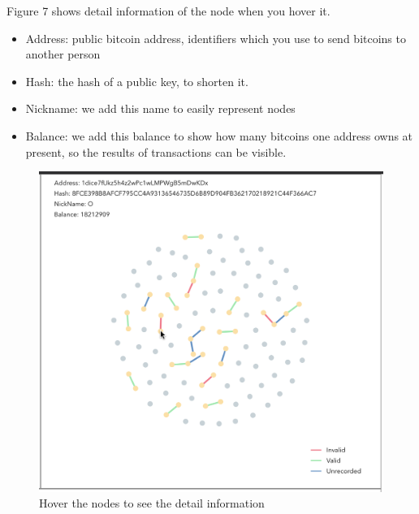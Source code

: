 \documentclass[journal, a4paper]{IEEEtran}
\begin{document}
Figure 7 shows detail information of the node when you hover it.
\begin{itemize}
    \item Address: public bitcoin address, identifiers which you use to send bitcoins to another person
    \item Hash: the hash of a public key, to shorten it.
    \item Nickname: we add this name to easily represent nodes
    \item Balance: we add this balance to show how many bitcoins one address owns at present, so the results of transactions can be visible.
\end{itemize}
\begin{figure}[!hbt]
		\begin{center}
		\includegraphics[width=\columnwidth]{transaction_hover.png}
		\caption{Hover the nodes to see the detail information}
		\label{fig:transaction_hover}
		\end{center}
	\end{figure}
\end{document}
